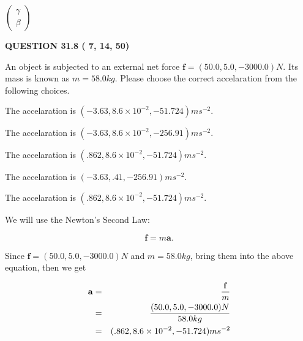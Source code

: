 \documentclass[12pt]{article}
\begin{document}
   
 $  \left( \begin{array}
 {
 c
 }
 \gamma \\ 
 \beta
 \end{array} \right) $ 
  
\vspace{0.2in}
  
{\textbf{\Large{QUESTION
31.8 
 (          7,         14,         50)
}}}
  
  
 
An object is subjected to an external net force $\mathbf{f}=
(50.0 , 5.0 , -3000.0) N$.
Its mass is known as $m= %
58.0 kg$.
Please choose the correct accelaration from the following choices.
 
 
  The accelaration is $  %
(
-3.63,
8.6 \times 10^{-2},
-51.724)
ms^{-2} $.
 
 
  The accelaration is $  %
(
-3.63,
8.6 \times 10^{-2},
-256.91)
ms^{-2} $.
 
 
  The accelaration is $  %
(
.862,
8.6 \times 10^{-2},
-51.724)
ms^{-2} $.
 
 
  The accelaration is $  %
(
-3.63,
.41,
-256.91)
ms^{-2} $.
 
 
\noindent{}
 
 
  The accelaration is $  %
(
.862,
8.6 \times 10^{-2},
-51.724)
ms^{-2} $.
 
 
\noindent{}
 
 
 
 
 
\noindent{}
 
 

We will use the Newton's Second Law:
 
\[
\mathbf{f}=m\mathbf{a}.
\]
 
Since $\mathbf{f}= %
(50.0 , 5.0 , -3000.0) N$
and $m= %
58.0kg$, bring them into the above equation, then we get
 
\begin{eqnarray*}
\mathbf{a}&=&\frac{\mathbf{f}}m  \\
&=&\frac{ %
(50.0 , 5.0 , -3000.0) N}{ %
58.0kg}  \\
&=& %
(.862 , 8.6 \times 10^{-2} , -51.724) ms^{-2}
\end{eqnarray*}
 
\end{document}
